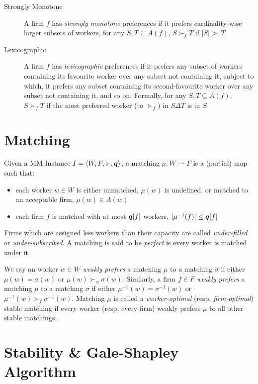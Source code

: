 \begin{description}
  \item[Strongly Monotone] A firm $f$ has \textit{strongly monotone} preferences if it prefers cardinality-wise larger subsets of workers, \ie for any $S, T \subseteq A(f)$, $S \succ_f T$ if $|S| > |T|$
  \item[Lexicographic] A firm $f$ has \textit{lexicographic} preferences if it prefers any subset of workers containing its favourite worker over any subset not containing it, subject to which, it prefers any subset containing its second-favourite worker over any subset not containing it, and so on. Formally, for any $S, T \subseteq A(f)$, $S \succ_f T$ if the most preferred worker (to $\succ_f$) in $S \Delta T$ is in $S$
\end{description}

\newpage

\section{Matching}

Given a MM Instance $I = \left< W, F, \succ, \boldsymbol{q} \right>$, a matching $\mu : W \rightharpoonup F$ is a (partial) map such that:

\begin{itemize}
  \item each worker $w \in W$ is either unmatched, \ie $\mu(w)$ is undefined, or matched to an acceptable firm, \ie $\mu(w) \in A(w)$
  \item each firm $f$ is matched with at most $\boldsymbol{q}[f]$ workers, \ie $|\mu^{-1}(f)| \leq \boldsymbol{q}[f]$
\end{itemize}

Firms which are assigned less workers than their capacity are called \textit{under-filled} or \textit{under-subscribed}. A matching is said to be \textit{perfect} is every worker is matched under it.

We say an worker $w \in W$ \textit{weakly prefers} a matching $\mu$ to a matching $\sigma$ if either $\mu(w) = \sigma(w)$ or $\mu(w) \succ_w \sigma(w)$. Similarly, a firm $f \in F$ \textit{weakly prefers} a matching $\mu$ to a matching $\sigma$ if either $\mu^{-1}(w) = \sigma^{-1}(w)$ or $\mu^{-1}(w) \succ_f \sigma^{-1}(w)$. Matching $\mu$ is called a \textit{worker-optimal} (resp. \textit{firm-optimal}) stable matching if every worker (resp. every firm) weakly prefers $\mu$ to all other stable matchings.

\section{Stability \& Gale-Shapley Algorithm}


